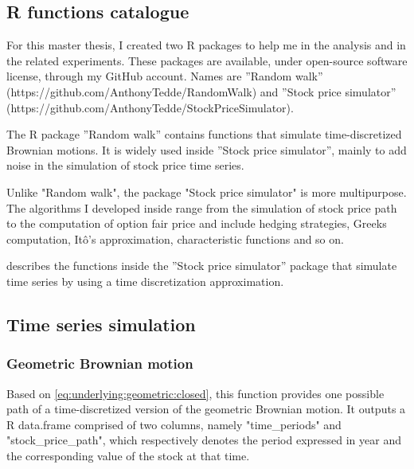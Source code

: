 \documentclass[12pt]{report}
\begin{document}
\begin{appendices}
\chapter{R functions catalogue}


For this master thesis, I created two R packages to help me in the analysis and in the related experiments. These packages are available, under open-source software license, through my GitHub account. Names are ”Random walk”  (https://github.com/AnthonyTedde/RandomWalk) and ”Stock price simulator” (https://github.com/AnthonyTedde/StockPriceSimulator).

The R package ”Random walk” contains functions that simulate time-discretized Brownian motions. It is widely used inside ”Stock price simulator”, mainly to add noise in the simulation of stock price time series. 

Unlike "Random walk", the package "Stock price simulator" is more multipurpose. The algorithms I developed inside range from the simulation of stock price path to the computation of option fair price and include hedging strategies, Greeks computation, Itô's approximation, characteristic functions and so on.

 describes the functions inside the ”Stock price simulator” package that simulate time series by using a time discretization approximation.

\section{Time series simulation}
\label{sec:r:time}





\subsection{Geometric Brownian motion}
\label{sub:r:time:geometric}

Based on \cref{eq:underlying:geometric:closed}, this function provides one possible path of a time-discretized version of the geometric Brownian motion.
It outputs a R data.frame comprised of two columns, namely "time\_periods" and "stock\_price\_path", which respectively denotes the period expressed in year and the corresponding value of the stock at that time.


\end{appendices}
\end{document}
